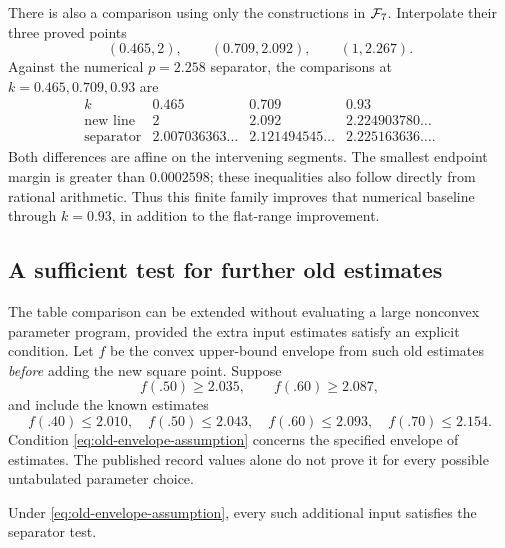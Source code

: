 There is also a comparison using only the constructions in
\(\mathcal F_7\).  Interpolate their three proved points
\[
 (0.465,2),\qquad(0.709,2.092),\qquad(1,2.267).
\]
Against the numerical \(p=2.258\) separator, the comparisons at
\(k=0.465,0.709,0.93\) are
\[
\begin{array}{c|ccc}
k&0.465&0.709&0.93\\ \hline
\text{new line}&2&2.092&2.224903780\ldots\\
\text{separator}&2.007036363\ldots&2.121494545\ldots&
 2.225163636\ldots .
\end{array}
\]
Both differences are affine on the intervening segments.
The smallest endpoint margin is greater than \(0.0002598\);
these inequalities also follow directly from rational arithmetic.
Thus this finite family improves that numerical baseline through
\(k=0.93\), in addition to the flat-range improvement.

\subsection{A sufficient test for further old estimates}

The table comparison can be extended without evaluating a large
nonconvex parameter program, provided the extra input estimates
satisfy an explicit condition.
Let \(f\) be the convex upper-bound envelope from such old estimates
\emph{before} adding the new square point.
Suppose
\begin{equation}\label{eq:old-envelope-assumption}
 f(.50)\ge2.035,\qquad f(.60)\ge2.087,
\end{equation}
and include the known estimates
\[
 f(.40)\le2.010,\quad f(.50)\le2.043,\quad
 f(.60)\le2.093,\quad f(.70)\le2.154.
\]
Condition \eqref{eq:old-envelope-assumption} concerns the specified
envelope of estimates.  The published record values alone do not
prove it for every possible untabulated parameter choice.

\begin{proposition}\label{prop:extra-inputs}
Under \eqref{eq:old-envelope-assumption}, every such additional input
satisfies the separator test.
\end{proposition}

